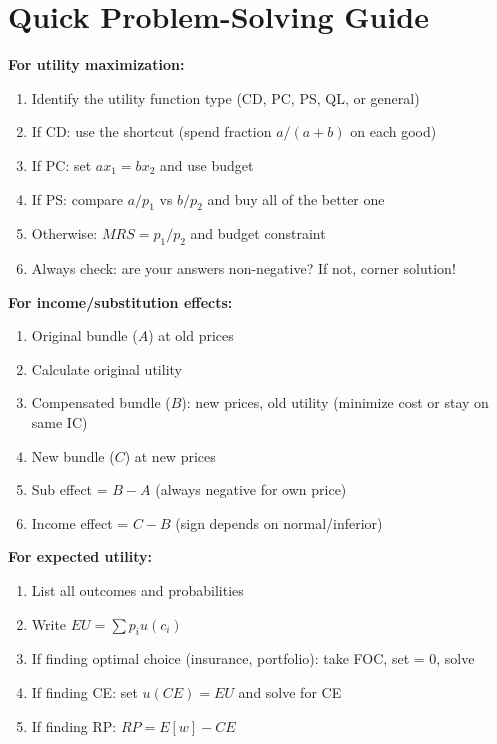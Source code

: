 \documentclass[11pt]{article}
\begin{document}
\section{Quick Problem-Solving Guide}

\begin{steps}
\textbf{For utility maximization:}
\begin{enumerate}
    \item Identify the utility function type (CD, PC, PS, QL, or general)
    \item If CD: use the shortcut (spend fraction $a/(a+b)$ on each good)
    \item If PC: set $ax_1 = bx_2$ and use budget
    \item If PS: compare $a/p_1$ vs $b/p_2$ and buy all of the better one
    \item Otherwise: $MRS = p_1/p_2$ and budget constraint
    \item Always check: are your answers non-negative? If not, corner solution!
\end{enumerate}
\end{steps}

\begin{steps}
\textbf{For income/substitution effects:}
\begin{enumerate}
    \item Original bundle ($A$) at old prices
    \item Calculate original utility
    \item Compensated bundle ($B$): new prices, old utility (minimize cost or stay on same IC)
    \item New bundle ($C$) at new prices
    \item Sub effect = $B - A$ (always negative for own price)
    \item Income effect = $C - B$ (sign depends on normal/inferior)
\end{enumerate}
\end{steps}

\begin{steps}
\textbf{For expected utility:}
\begin{enumerate}
    \item List all outcomes and probabilities
    \item Write $EU = \sum p_i u(c_i)$
    \item If finding optimal choice (insurance, portfolio): take FOC, set = 0, solve
    \item If finding CE: set $u(CE) = EU$ and solve for CE
    \item If finding RP: $RP = E[w] - CE$
\end{enumerate}
\end{steps}
\end{document}
